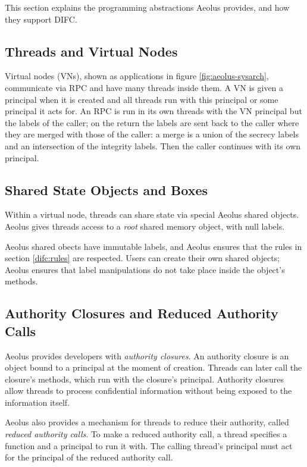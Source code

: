 This section explains the programming abstractions Aeolus provides, and how they support DIFC.

\subsection{Threads and Virtual Nodes}

Virtual nodes (VNs), shown as applications in figure \ref{fig:aeolus-sysarch}, communicate via RPC and have many threads inside them. A VN is given a principal when it is created and all threads run with this principal or some principal it acts for. An RPC is run in its own threads with the VN principal but the labels of the caller; on the return the labels are sent back to the caller where they are merged with those of the caller: a merge is a union of the secrecy labels and an intersection of the integrity labels. Then the caller continues with its own principal.

\subsection{Shared State Objects and Boxes}\label{aeolus:shared-mem}

Within a virtual node, threads can share state via special Aeolus shared objects. Aeolus gives threads access to a \emph{root} shared memory object, with null labels.

Aeolus shared obects have immutable labels, and Aeolus ensures that the rules in section \ref{difc:rules} are respected. Users can create their own shared objects; Aeolus ensures that label manipulations do not take place inside the object's methods.

\subsection{Authority Closures and Reduced Authority Calls}
\label{aeolus:auth-calls}

Aeolus provides developers with \emph{authority closures}. An authority closure is an object bound to a principal at the moment of creation. Threads can later call the closure's methods, which run with the closure's principal. Authority closures allow threads to process confidential information without being exposed to the information itself.

Aeolus also provides a mechanism for threads to reduce their authority, called \emph{reduced authority calls}. To make a reduced authority call, a thread specifies a function and a principal to run it with. The calling thread's principal must act for the principal of the reduced authority call.

